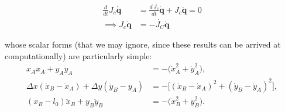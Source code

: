 \begin{align}
    \frac{d}{dt} J_c \dot{\mathbf q} &= \frac{d\, J_c}{dt} \dot{\mathbf q} + J_c \ddot{\mathbf q} = 0 \nonumber \\
    \implies J_c \ddot{\mathbf q} &= - \dot{J_C} \dot{\mathbf q}
\end{align}

whose scalar forms (that we may ignore, since these results can be arrived at computationally) are particularly simple:
\begin{align}
    x_A\ddot x_A+y_A\ddot y_A
    &=-\bigl(\dot x_A^2+\dot y_A^2\bigr),\\
    \Delta x(\ddot x_B-\ddot x_A)
      +\Delta y(\ddot y_B-\ddot y_A)
    &=-\bigl[(\dot x_B-\dot x_A)^2+(\dot y_B-\dot y_A)^2\bigr],\\
    (x_B-l_0)\ddot x_B+y_B\ddot y_B
    &=-\bigl(\dot x_B^2+\dot y_B^2\bigr).
    \label{eq:fourbar_cartesian_acc_components}
\end{align}

